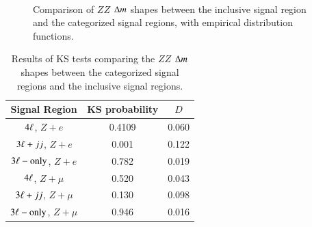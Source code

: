 \begin{figure}[htbp]
{		
	} \\
	\caption{Comparison of $ZZ$ $\Delta m$ shapes between the inclusive signal region and the categorized signal regions, with empirical distribution functions.}
	\label{fig:inclusive-KS-tests-ZZ}
\end{figure}

\begin{table}[htbp]
	\centering
	\begin{tabular}{ccc}
		Signal Region & KS probability & $D$ \\
		\hline
		$4\ell$, $Z+e$ & 0.4109& 0.060 \\
		$3\ell+jj$, $Z+e$ & 0.001 & 0.122 \\
		$3\ell-\mathrm{only}$, $Z+e$ & 0.782 & 0.019 \\
		$4\ell$, $Z+\mu$ & 0.520 & 0.043 \\
		$3\ell+jj$, $Z+\mu$ & 0.130 & 0.098 \\
		$3\ell-\mathrm{only}$, $Z+\mu$ & 0.946 & 0.016
	\end{tabular}
	\caption{Results of KS tests comparing the $ZZ$ $\Delta m$ shapes between the categorized signal regions and the inclusive signal regions.}
	\label{table:inclusive-KS-tests-ZZ}
\end{table}


